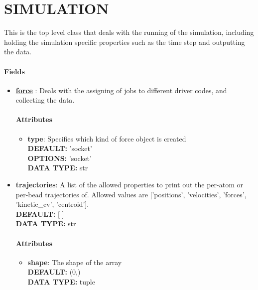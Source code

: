 \section{SIMULATION}
\label{SIMULATION}
This is the top level class that deals with the running of the simulation, including holding the simulation specific properties such as the time step and outputting the data.
\paragraph{Fields}
 \begin{itemize}
\item {\bf \hyperref[FORCES]{force} }:
 Deals with the assigning of jobs to different driver codes, and collecting the data.
\paragraph{Attributes}
 \begin{itemize}
\item {\bf type}:
 Specifies which kind of force object is created
{\\ \bf DEFAULT: }'socket'
{\\ \bf OPTIONS: }'socket'
{\\ \bf DATA TYPE: }str
\end{itemize}
 
\item {\bf trajectories}:
 A list of the allowed properties to print out the per-atom or per-bead trajectories of. Allowed values are ['positions', 'velocities', 'forces', 'kinetic\_cv', 'centroid'].
{\\ \bf DEFAULT: }[ ]
{\\ \bf DATA TYPE: }str
\paragraph{Attributes}
 \begin{itemize}
\item {\bf shape}:
 The shape of the array
{\\ \bf DEFAULT: }(0,)
{\\ \bf DATA TYPE: }tuple
\end{itemize}
 

\end{itemize}
